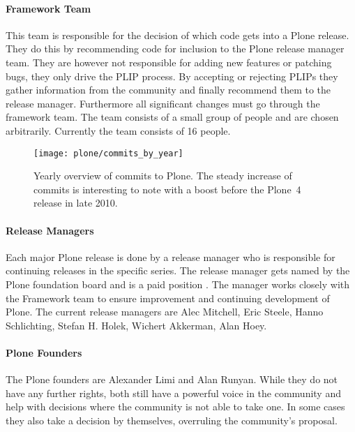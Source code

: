 \paragraph{Framework Team}

This team is responsible for the decision of which code gets into a Plone
release. They do this by recommending code for inclusion to the Plone release
manager team. They are however not responsible for adding new features or
patching bugs, they only drive the \ac{PLIP} process. By accepting or rejecting
\acp{PLIP} they gather information from the community and finally recommend
them to the release manager. Furthermore all significant changes must go
through the framework team. The team consists of a small group of people and
are chosen arbitrarily. Currently the team consists of 16 people.

\begin{figure}[thbp]
  \centering
  \texttt{[image: plone/commits\_by\_year]}
  \caption[Commits by Year, Plone]
  {Yearly overview of commits to Plone. The steady increase of commits is
    interesting to note with a boost before the Plone~4 release in late 2010.}
  \label{fig:plone:cby}
\end{figure}

\paragraph{Release Managers}

Each major Plone release is done by a release manager who is responsible for
continuing releases in the specific series. The release manager gets named by
the Plone foundation board and is a paid position
\cite{PlonePaidReleaseManager}. The manager works closely with the Framework
team to ensure improvement and continuing development of Plone. The current
release managers are Alec Mitchell, Eric Steele, Hanno Schlichting, Stefan H.
Holek, Wichert Akkerman, Alan Hoey.

\paragraph{Plone Founders}

The Plone founders are Alexander Limi and Alan Runyan. While they do not have
any further rights, both still have a powerful voice in the community and help
with decisions where the community is not able to take one. In some cases they
also take a decision by themselves, overruling the community's proposal.

